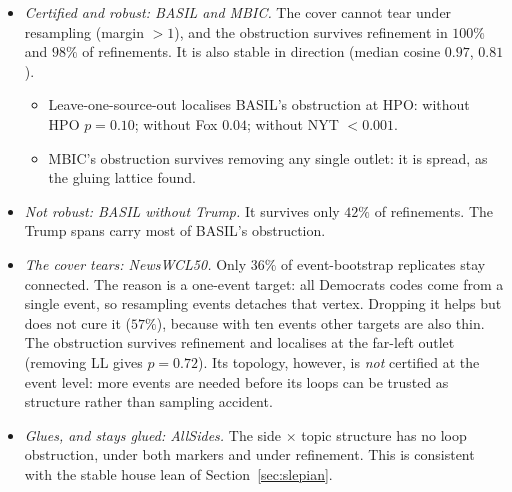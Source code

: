 \documentclass[11pt]{article}
\theoremstyle{definition}
\theoremstyle{remark}
\begin{document}
\begin{itemize}
  \item \emph{Certified and robust: BASIL and MBIC.} The cover cannot tear under resampling (margin $>1$), and the obstruction survives refinement in $100\%$ and $98\%$ of refinements. It is also stable in direction (median cosine $0.97$, $0.81$).
    \begin{itemize}
      \item Leave-one-source-out localises BASIL's obstruction at HPO: without HPO $p=0.10$; without Fox $0.04$; without NYT $<0.001$.
      \item MBIC's obstruction survives removing any single outlet: it is spread, as the gluing lattice found.
    \end{itemize}
  \item \emph{Not robust: BASIL without Trump.} It survives only $42\%$ of refinements. The Trump spans carry most of BASIL's obstruction.
  \item \emph{The cover tears: NewsWCL50.} Only $36\%$ of event-bootstrap replicates stay connected. The reason is a one-event target: all Democrats codes come from a single event, so resampling events detaches that vertex. Dropping it helps but does not cure it ($57\%$), because with ten events other targets are also thin. The obstruction survives refinement and localises at the far-left outlet (removing LL gives $p=0.72$). Its topology, however, is \emph{not} certified at the event level: more events are needed before its loops can be trusted as structure rather than sampling accident.
  \item \emph{Glues, and stays glued: AllSides.} The side $\times$ topic structure has no loop obstruction, under both markers and under refinement. This is consistent with the stable house lean of Section~\ref{sec:slepian}.
\end{itemize}
\end{document}
